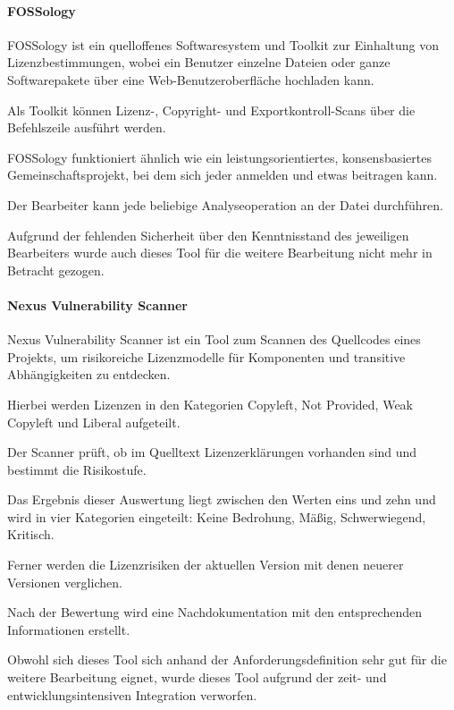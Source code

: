 \paragraph{FOSSology}

FOSSology ist ein quelloffenes Softwaresystem und Toolkit zur Einhaltung von Lizenzbestimmungen, wobei ein Benutzer einzelne Dateien oder ganze Softwarepakete über eine Web-Benutzeroberfläche hochladen kann. \cite{fossology_workgroup_fossology_2017} 

Als Toolkit können Lizenz-, Copyright- und Exportkontroll-Scans über die Befehlszeile ausführt werden.

FOSSology funktioniert ähnlich wie ein leistungsorientiertes, konsensbasiertes Gemeinschaftsprojekt, bei dem sich jeder anmelden und etwas beitragen kann. 

Der Bearbeiter kann jede beliebige Analyseoperation an der Datei durchführen. 

Aufgrund der fehlenden Sicherheit über den Kenntnisstand des jeweiligen Bearbeiters wurde auch dieses Tool für die weitere Bearbeitung nicht mehr in Betracht gezogen. 

\paragraph{Nexus Vulnerability Scanner}

Nexus Vulnerability Scanner ist ein Tool zum Scannen des Quellcodes eines Projekts, um risikoreiche Lizenzmodelle für Komponenten und transitive Abhängigkeiten zu entdecken. \cite{sonatype_nexus_2008} 

Hierbei werden Lizenzen in den Kategorien Copyleft, Not Provided, Weak Copyleft und Liberal aufgeteilt. 

Der Scanner prüft, ob im Quelltext Lizenzerklärungen vorhanden sind und bestimmt die Risikostufe. 

Das Ergebnis dieser Auswertung liegt zwischen den Werten eins und zehn und wird in vier Kategorien eingeteilt: Keine Bedrohung, Mäßig, Schwerwiegend, Kritisch. \cite{sonatype_guide_nodate} 

Ferner werden die Lizenzrisiken der aktuellen Version mit denen neuerer Versionen verglichen. 

Nach der Bewertung wird eine Nachdokumentation mit den entsprechenden Informationen erstellt. 

Obwohl sich dieses Tool sich anhand der Anforderungsdefinition sehr gut für die weitere Bearbeitung eignet, wurde dieses Tool aufgrund der zeit- und entwicklungsintensiven Integration verworfen.

